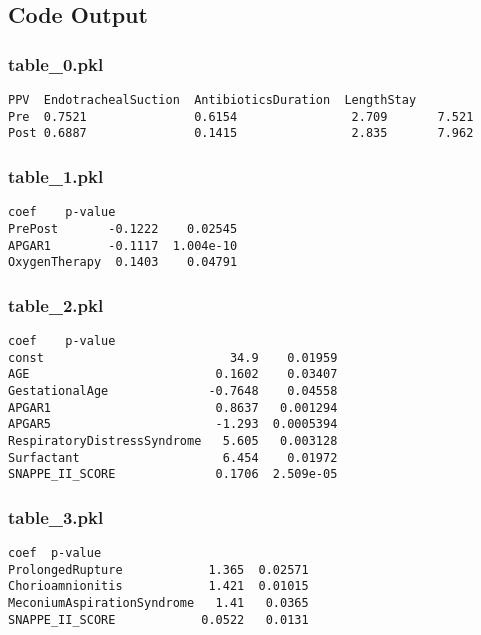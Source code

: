 \documentclass[11pt]{article}
\begin{document}
\subsection{Code Output}

\subsubsection*{table\_0.pkl}

\begin{Verbatim}[tabsize=4]
        PPV  EndotrachealSuction  AntibioticsDuration  LengthStay
Pre  0.7521               0.6154                2.709       7.521
Post 0.6887               0.1415                2.835       7.962
\end{Verbatim}

\subsubsection*{table\_1.pkl}

\begin{Verbatim}[tabsize=4]
                 coef    p-value
PrePost       -0.1222    0.02545
APGAR1        -0.1117  1.004e-10
OxygenTherapy  0.1403    0.04791
\end{Verbatim}

\subsubsection*{table\_2.pkl}

\begin{Verbatim}[tabsize=4]
                               coef    p-value
const                          34.9    0.01959
AGE                          0.1602    0.03407
GestationalAge              -0.7648    0.04558
APGAR1                       0.8637   0.001294
APGAR5                       -1.293  0.0005394
RespiratoryDistressSyndrome   5.605   0.003128
Surfactant                    6.454    0.01972
SNAPPE_II_SCORE              0.1706  2.509e-05
\end{Verbatim}

\subsubsection*{table\_3.pkl}

\begin{Verbatim}[tabsize=4]
                             coef  p-value
ProlongedRupture            1.365  0.02571
Chorioamnionitis            1.421  0.01015
MeconiumAspirationSyndrome   1.41   0.0365
SNAPPE_II_SCORE            0.0522   0.0131
\end{Verbatim}
\end{document}
